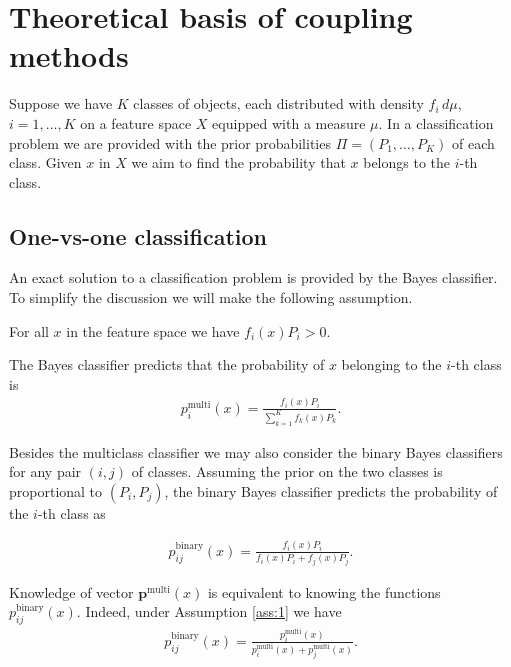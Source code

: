 \section{Theoretical basis of coupling methods} \label{sec:theory}

Suppose we have $K$ classes of objects, each distributed with density $f_i\, d\mu$, $i=1,\ldots, K$ on a feature 
space $X$ equipped with a measure $\mu$. In a classification problem we are provided with 
the prior probabilities $\Pi = (P_1, \ldots, P_K)$ of each class. Given $x$ in $X$ we aim to find 
the probability that $x$ belongs to the $i$-th class. 


\subsection{One-vs-one classification} \label{sec:one-vs-one}

An exact solution to a classification problem is provided by the Bayes classifier. To simplify the discussion we will make the following assumption.

\begin{assumption} \label{ass:1}
For all $x$ in the feature space we have $f_i(x) P_i > 0$.
\end{assumption}


The Bayes classifier predicts that the probability of $x$ belonging to the $i$-th class is
\begin{align}
 p^\textrm{multi}_i(x) = \frac{f_i(x) P_i}{\sum_{k=1}^K f_k(x)P_k}.
\end{align}

Besides the multiclass classifier we may also consider the binary Bayes classifiers for any pair $(i,j)$ of 
classes. Assuming the prior on the two classes is proportional to $(P_i, P_j)$, the binary Bayes classifier 
predicts the probability of the $i$-th class as 

\begin{align}
	p_{ij}^\textrm{binary}(x) = \frac{f_i(x) P_i}{f_i(x)P_i + f_j(x)P_j}.
\end{align}

Knowledge of vector $\boldsymbol{p}^\textrm{multi}(x)$ is equivalent to knowing the functions $p^\textrm{binary}_{ij}(x)$. Indeed, under Assumption \ref{ass:1} we have
\begin{align}
p_{ij}^\textrm{binary}(x) = \frac{p_i^\textrm{multi}(x)}{p_i^\textrm{multi}(x) + p_j^\textrm{multi}(x)}. \label{eq:bt1}
\end{align}

